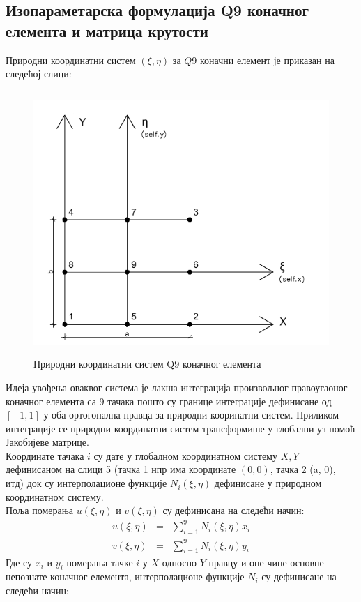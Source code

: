 \documentclass[11pt, a4paper]{article}
\begin{document}
\subsection{Изопараметарска формулација Q9 коначног елемента и матрица крутости}
Природни координатни систем $(\xi, \eta)$ за $Q9$ коначни елемент је приказан на следећој слици:
\begin{figure}[H]
\includegraphics[width=\textwidth, height=10cm]{Slike/Q9_izoparametarski.png}
\caption{Природни координатни систем Q9 коначног елемента}
\end{figure}
Идеја увођења оваквог система је лакша интеграција произвољног правоугаоног коначног елемента са 9 тачака пошто су границе интеграције дефинисане од $[-1,1]$ у оба ортогонална правца за природни кооринатни систем. Приликом интеграције се природни координатни систем трансформише у глобални уз помоћ Јакобијеве матрице.\\
Координате тачака $i$ су дате у глобалном координатном систему $X,Y$ дефинисаном на слици 5 (тачка 1 нпр има координате $(0,0)$, тачка 2 (a, 0), итд) док су интерполационе функције $N_i(\xi, \eta)$ дефинисане у природном координатном систему.\\
Поља померања $u(\xi, \eta)$ и $v(\xi, \eta)$ су дефинисана на следећи начин:
\begin{eqnarray}
u(\xi, \eta) &=& \sum_{i=1} ^9 N_{i}(\xi, \eta)x_i\\
v(\xi, \eta) &=& \sum_{i=1} ^9 N_{i}(\xi, \eta)y_i
\end{eqnarray}
Где су $x_i$ и $y_i$ померања тачке $i$ у $X$ односно $Y$ правцу и оне чине основне непознате коначног елемента, интерполационе функције $N_i$ су дефинисане на следећи начин:
\end{document}
